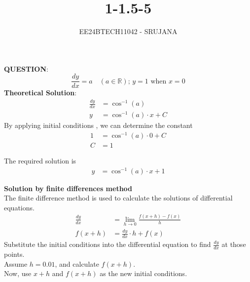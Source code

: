 \documentclass[journal]{IEEEtran}
\begin{document}

\vspace{3cm}

\title{1-1.5-5}
\author{EE24BTECH11042 - SRUJANA}
{\let\newpage\relax\maketitle}

\renewcommand{\thefigure}{\theenumi}
\renewcommand{\thetable}{\theenumi}
\setlength{\intextsep}{10pt} 

\renewcommand{\thetable}{\theenumi}

\textbf{QUESTION}:\\
\[
\frac{dy}{dx} = a \quad (a \in \mathbb{R}); \, y = 1 \text{ when } x = 0
\]
\textbf{Theoretical Solution}:\\
\begin{align}
   \frac{dy}{dx} &= \cos^{-1}(a) \\
   y &= \cos^{-1}(a) \cdot x + C
\end{align}
By applying initial conditions , we can determine the constant\\
\begin{align}
    1 &= \cos^{-1}(a) \cdot 0 + C\\
    C &= 1
\end{align}

The required solution is 
\begin{align}
    y &= \cos^{-1}(a) \cdot x +1
\end{align}


\textbf{Solution by finite differences method}\\

The finite difference method is used to calculate the solutions of differential equations.\\

\begin{align}
    \frac{dy}{dx} &= \lim_{h \to 0}\frac{f(x+h)-f(x)}{h}\\
    f(x+h) &= \frac{dy}{dx} \cdot h + f(x)
\end{align}
Substitute the initial conditions into the differential equation to find $\frac{dy}{dx}$ at those points. \\

Assume $h = 0.01$, and calculate $f(x+h)$. \\

Now, use $x+h$ and $f(x+h)$ as the new initial conditions. \\
\end{document}
